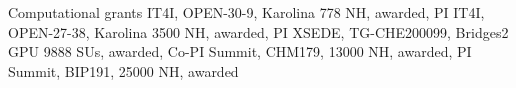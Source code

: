 \begin{rubric}{Computational grants}
%
\entry*[\hspace{1.05cm}2024]%
  IT4I, OPEN-30-9, Karolina 778 NH, awarded, PI
\entry*[\hspace{1.05cm}2023]%
  IT4I, OPEN-27-38, Karolina 3500 NH, awarded, PI
\entry*[2021]%
  XSEDE, TG-CHE200099, Bridges2 GPU 9888 SUs, awarded, Co-PI
\entry*[2020]%
  Summit, CHM179, 13000 NH, awarded, PI
\entry*[2019]%
  Summit, BIP191, 25000 NH, awarded 
\end{rubric}